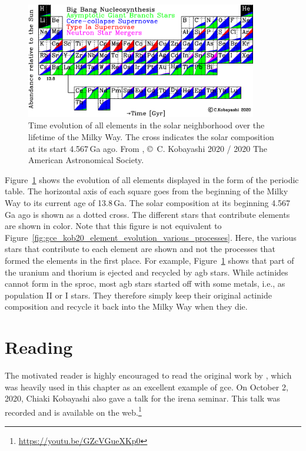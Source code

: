 \begin{figure}[tb]
    \centering
    \includegraphics[width=0.9\textwidth]{graphics/gce/kobayashi20_fig39}
    \caption{Time evolution of all elements in the solar neighborhood over the lifetime of the Milky Way. The cross indicates the solar composition at its start 4.567\,Ga ago. From \citet{kobayashi20}, \copyright\ C. Kobayashi 2020 / 2020 The American Astronomical Society.}
    \label{fig:gce:kob20_origin_elements}
\end{figure}
Figure~\ref{fig:gce:kob20_origin_elements} shows the evolution of all elements displayed in the form of the periodic table. The horizontal axis of each square goes from the beginning of the Milky Way to its current age of 13.8\,Ga. The solar composition at its beginning 4.567\,Ga ago is shown as a dotted cross. The different stars that contribute elements are shown in color. Note that this figure is not equivalent to Figure~\ref{fig:gce_kob20_element_evolution_various_processes}. Here, the various stars that contribute to each element are shown and not the processes that formed the elements in the first place. For example, Figure~\ref{fig:gce:kob20_origin_elements} shows that part of the uranium and thorium is ejected and recycled by \ac{agb} stars. While actinides cannot form in the \ac{sproc}, most \ac{agb} stars started off with some metals, i.e., as population II or I stars. They therefore simply keep their original actinide composition and recycle it back into the Milky Way when they die.


\section{Reading}

The motivated reader is highly encouraged to read the original work by \citet{kobayashi20}, which was heavily used in this chapter as an excellent example of \ac{gce}. 
On October 2, 2020, Chiaki Kobayashi also gave a talk for the \acf{irena} seminar. This talk was recorded and is available on the web.\footnote{\url{https://youtu.be/GZcVGueXKp0}}

